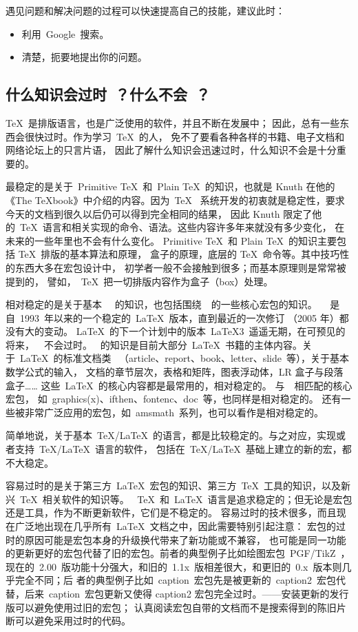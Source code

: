 遇见问题和解决问题的过程可以快速提高自己的技能，建议此时：
\begin{itemize}
  \item 利用~Google~搜索。
  \item 清楚，扼要地提出你的问题。
\end{itemize}

\subsection{什么知识会过时~？什么不会~？}

\TeX~是排版语言，也是广泛使用的软件，并且不断在发展中；
因此，总有一些东西会很快过时。作为学习~\TeX~的人，
免不了要看各种各样的书籍、电子文档和网络论坛上的只言片语，
因此了解什么知识会迅速过时，什么知识不会是十分重要的。

最稳定的是关于~Primitive \TeX~和~Plain \TeX~的知识，也就是 Knuth
在他的《The TeXbook》中介绍的内容。因为~\TeX~
系统开发的初衷就是稳定性，要求今天的文档到很久以后仍可以得到完全相同的结果，
因此 Knuth 限定了他的~\TeX~语言和相关实现的命令、语法。这些内容许多年来就没有多少变化，
在未来的一些年里也不会有什么变化。
Primitive \TeX~和 Plain \TeX~的知识主要包括 \TeX~排版的基本算法和原理，
盒子的原理，底层的 \TeX~命令等。其中技巧性的东西大多在宏包设计中，
初学者一般不会接触到很多；而基本原理则是常常被提到的，
譬如，~\TeX~把一切排版内容作为盒子（box）处理。

相对稳定的是关于基本~\LaTeXe~
的知识，也包括围绕~\LaTeXe~的一些核心宏包的知识。~\LaTeXe~
是自~1993~年以来的一个稳定的~\LaTeX~版本，直到最近的一次修订
（2005 年）都没有大的变动。
\LaTeX~的下一个计划中的版本~\LaTeX 3~遥遥无期，在可预见的将来，~\LaTeXe~不会过时。
\LaTeXe~的知识是目前大部分~\LaTeX~书籍的主体内容。关于~\LaTeX~的标准文档类
~（article、report、book、letter、slide~等），关于基本数学公式的输入，
文档的章节层次，表格和矩阵，图表浮动体，LR 盒子与段落盒子……
这些~\LaTeX~的核心内容都是最常用的，相对稳定的。
与~\LaTeXe~相匹配的核心宏包，
如~graphics(x)、ifthen、fontenc、doc~等，也同样是相对稳定的。
还有一些被非常广泛应用的宏包，如~amsmath~系列，也可以看作是相对稳定的。

简单地说，关于基本~\TeX/\LaTeX~的语言，都是比较稳定的。与之对应，实现或者支持~\TeX/\LaTeX~语言的软件，
包括在~\TeX/\LaTeX~基础上建立的新的宏，都不大稳定。

容易过时的是关于第三方~\LaTeX~宏包的知识、第三方~\TeX~工具的知识，以及新兴~\TeX~相关软件的知识等。
~\TeX~和~\LaTeX~语言是追求稳定的；但无论是宏包还是工具，作为不断更新软件，它们是不稳定的。
容易过时的技术很多，而且现在广泛地出现在几乎所有~\LaTeX~文档之中，因此需要特别引起注意：
宏包的过时的原因可能是宏包本身的升级换代带来了新功能或不兼容，
也可能是同一功能的更新更好的宏包代替了旧的宏包。前者的典型例子比如绘图宏包~PGF/TikZ~，
现在的~2.00~版功能十分强大，和旧的~1.1x~版相差很大，和更旧的~0.x~版本则几乎完全不同；后
者的典型例子比如~caption~宏包先是被更新的~caption2~宏包代替，后来~caption~宏包更新又使得
caption2 宏包完全过时。——安装更新的发行版可以避免使用过旧的宏包；
认真阅读宏包自带的文档而不是搜索得到的陈旧片断可以避免采用过时的代码。

